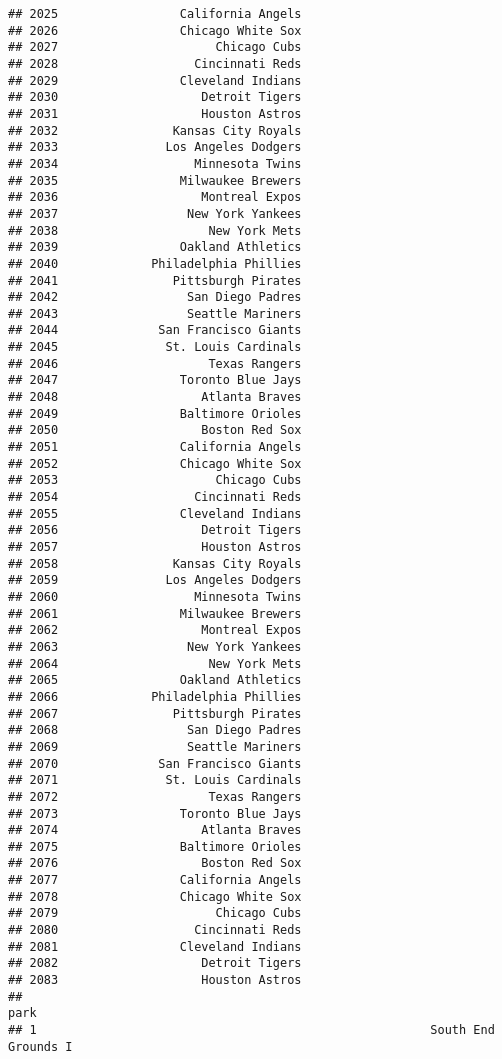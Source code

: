 \documentclass[]{article}
\begin{document}
\begin{verbatim}
## 2025                 California Angels
## 2026                 Chicago White Sox
## 2027                      Chicago Cubs
## 2028                   Cincinnati Reds
## 2029                 Cleveland Indians
## 2030                    Detroit Tigers
## 2031                    Houston Astros
## 2032                Kansas City Royals
## 2033               Los Angeles Dodgers
## 2034                   Minnesota Twins
## 2035                 Milwaukee Brewers
## 2036                    Montreal Expos
## 2037                  New York Yankees
## 2038                     New York Mets
## 2039                 Oakland Athletics
## 2040             Philadelphia Phillies
## 2041                Pittsburgh Pirates
## 2042                  San Diego Padres
## 2043                  Seattle Mariners
## 2044              San Francisco Giants
## 2045               St. Louis Cardinals
## 2046                     Texas Rangers
## 2047                 Toronto Blue Jays
## 2048                    Atlanta Braves
## 2049                 Baltimore Orioles
## 2050                    Boston Red Sox
## 2051                 California Angels
## 2052                 Chicago White Sox
## 2053                      Chicago Cubs
## 2054                   Cincinnati Reds
## 2055                 Cleveland Indians
## 2056                    Detroit Tigers
## 2057                    Houston Astros
## 2058                Kansas City Royals
## 2059               Los Angeles Dodgers
## 2060                   Minnesota Twins
## 2061                 Milwaukee Brewers
## 2062                    Montreal Expos
## 2063                  New York Yankees
## 2064                     New York Mets
## 2065                 Oakland Athletics
## 2066             Philadelphia Phillies
## 2067                Pittsburgh Pirates
## 2068                  San Diego Padres
## 2069                  Seattle Mariners
## 2070              San Francisco Giants
## 2071               St. Louis Cardinals
## 2072                     Texas Rangers
## 2073                 Toronto Blue Jays
## 2074                    Atlanta Braves
## 2075                 Baltimore Orioles
## 2076                    Boston Red Sox
## 2077                 California Angels
## 2078                 Chicago White Sox
## 2079                      Chicago Cubs
## 2080                   Cincinnati Reds
## 2081                 Cleveland Indians
## 2082                    Detroit Tigers
## 2083                    Houston Astros
##                                                                        park
## 1                                                       South End Grounds I

\end{verbatim}
\end{document}
